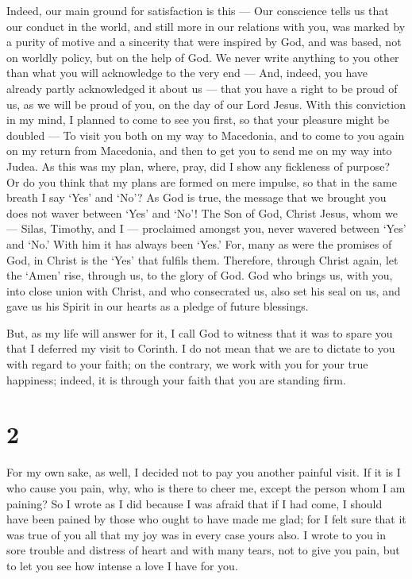  Indeed, our main ground for satisfaction is this --- Our
conscience tells us that our conduct in the world, and still more in our
relations with you, was marked by a purity of motive and a sincerity
that were inspired by God, and was based, not on worldly policy, but on
the help of God.  We never write anything to you other than
what you will acknowledge to the very end ---  And, indeed,
you have already partly acknowledged it about us --- that you have a
right to be proud of us, as we will be proud of you, on the day of our
Lord Jesus.  With this conviction in my mind, I planned to
come to see you first, so that your pleasure might be doubled ---
 To visit you both on my way to Macedonia, and to come to
you again on my return from Macedonia, and then to get you to send me on
my way into Judea.  As this was my plan, where, pray, did I
show any fickleness of purpose? Or do you think that my plans are formed
on mere impulse, so that in the same breath I say `Yes' and `No'?
 As God is true, the message that we brought you does not
waver between `Yes' and `No'!  The Son of God, Christ
Jesus, whom we --- Silas, Timothy, and I --- proclaimed amongst you,
never wavered between `Yes' and `No.' With him it has always been `Yes.'
 For, many as were the promises of God, in Christ is the
`Yes' that fulfils them. Therefore, through Christ again, let the `Amen'
rise, through us, to the glory of God.  God who brings us,
with you, into close union with Christ, and who consecrated us,
 also set his seal on us, and gave us his Spirit in our
hearts as a pledge of future blessings.

 But, as my life will answer for it, I call God to witness
that it was to spare you that I deferred my visit to Corinth.
 I do not mean that we are to dictate to you with regard to
your faith; on the contrary, we work with you for your true happiness;
indeed, it is through your faith that you are standing firm.

\hypertarget{section-1}{%
\section{2}\label{section-1}}

 For my own sake, as well, I decided not to pay you another
painful visit.  If it is I who cause you pain, why, who is
there to cheer me, except the person whom I am paining?  So
I wrote as I did because I was afraid that if I had come, I should have
been pained by those who ought to have made me glad; for I felt sure
that it was true of you all that my joy was in every case yours also.
 I wrote to you in sore trouble and distress of heart and
with many tears, not to give you pain, but to let you see how intense a
love I have for you.

